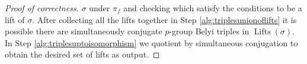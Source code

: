 \documentclass{dcthesis}
\newcommand{\PP}{\mathbb P}
\newcommand{\mm}[1]{{\color{blue} \sf MM: [#1]}}
\newcommand{\wt}[1]{\widetilde{#1}}
\DeclareMathOperator{\Lifts}{Lifts}
\numberwithin{equation}{section}
\theoremstyle{definition}
\theoremstyle{remark}
\begin{document}
{{\begin{proof}[Proof of correctness]
      $\sigma$ under $\pi_f$
      and checking which satisfy
      the conditions to be a lift of
      $\sigma$.
      After collecting all the lifts together
      in Step
      \ref{alg:triplesunionoflifts}
      it is possible there are
      simultaneously conjugate
      $p$-group Belyi triples
      in $\Lifts(\sigma)$.
      In Step
      \ref{alg:triplesuptoisomorphism}
      we quotient by
      simultaneous conjugation
      to obtain the desired
      set of lifts as output.

\end{proof}}}
\end{document}
